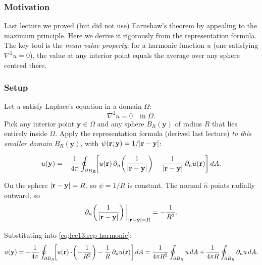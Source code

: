 \subsubsection*{Motivation}
Last lecture we proved (but did not use) Earnshaw's theorem by appealing to the maximum
principle.  Here we derive it rigorously from the representation formula.  The key tool is
the \emph{mean value property}: for a harmonic function $u$ (one satisfying
$\nabla^2 u = 0$), the value at any interior point equals the average over any sphere
centred there.

\subsubsection*{Setup}
Let $u$ satisfy Laplace's equation in a domain $\Omega$:
\begin{equation}\label{eq:lec13:laplace}
  \nabla^2 u = 0 \quad \text{in } \Omega.
\end{equation}
Pick any interior point $\mathbf{y}\in\Omega$ and any sphere $B_R(\mathbf{y})$ of radius $R$
that lies entirely inside $\Omega$.  Apply the representation formula (derived last lecture)
\emph{to this smaller domain} $B_R(\mathbf{y})$, with $\psi(\mathbf{r};\mathbf{y}) = 1/|\mathbf{r}-\mathbf{y}|$:

\begin{equation}\label{eq:lec13:rep-harmonic}
  u(\mathbf{y})
  = -\frac{1}{4\pi}
  \oint_{\partial B_R}
  \!\!\left[
    u(\mathbf{r})\,\partial_n\!\left(\frac{1}{|\mathbf{r}-\mathbf{y}|}\right)
    - \frac{1}{|\mathbf{r}-\mathbf{y}|}\,\partial_n u(\mathbf{r})
  \right] dA.
\end{equation}

On the sphere $|\mathbf{r} - \mathbf{y}| = R$, so $\psi = 1/R$ is constant.
The normal $\hat{n}$ points radially outward, so
\begin{equation}\label{eq:lec13:psi-deriv}
  \partial_n\!\left(\frac{1}{|\mathbf{r}-\mathbf{y}|}\right)\bigg|_{|\mathbf{r}-\mathbf{y}|=R}
  = -\frac{1}{R^2}.
\end{equation}

Substituting into \eqref{eq:lec13:rep-harmonic}:
\begin{equation}\label{eq:lec13:two-terms}
  u(\mathbf{y})
  = -\frac{1}{4\pi}
  \oint_{\partial B_R}
  \!\!\left[
    u(\mathbf{r})\cdot\!\left(-\frac{1}{R^2}\right)
    - \frac{1}{R}\,\partial_n u(\mathbf{r})
  \right] dA
  = \frac{1}{4\pi R^2}\oint_{\partial B_R} u\,dA
    + \frac{1}{4\pi R}\oint_{\partial B_R} \partial_n u\,dA.
\end{equation}


